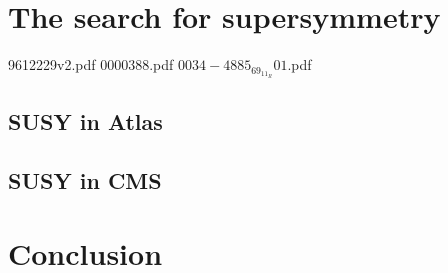 \documentclass[12pt]{report}
\begin{document}
\chapter{The search for supersymmetry}
9612229v2.pdf \cite{Dawson}
0000388.pdf \cite{Haber and Kane}
$0034-4885_69_11_R01$.pdf \cite{Pape and Treille}
\section{SUSY in Atlas}
\section{SUSY in CMS}





\chapter{Conclusion}





\end{document}
